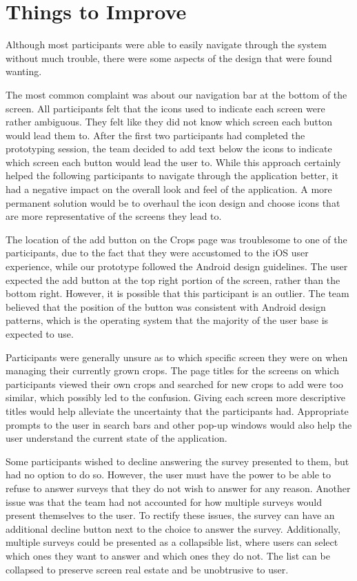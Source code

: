 \documentclass[12pt,letterpaper]{article}
\begin{document}
\section{Things to Improve}
Although most participants were able to easily navigate through the system without much trouble, there were some aspects of the design that were found wanting.\par
The most common complaint was about our navigation bar at the bottom of the screen. All participants felt that the icons used to indicate each screen were rather ambiguous. They felt like they did not know which screen each button would lead them to. After the first two participants had completed the prototyping session, the team decided to add text below the icons to indicate which screen each button would lead the user to. While this approach certainly helped the following participants to navigate through the application better, it had a negative impact on the overall look and feel of the application. A more permanent solution would be to overhaul the icon design and choose icons that are more representative of the screens they lead to.\par
The location of the add button on the Crops page was troublesome to one of the participants, due to the fact that they were accustomed to the iOS user experience, while our prototype followed the Android design guidelines. The user expected the add button at the top right portion of the screen, rather than the bottom right. However, it is possible that this participant is an outlier. The team believed that the position of the button was consistent with Android design patterns, which is the operating system that the majority of the user base is expected to use.\par
Participants were generally unsure as to which specific screen they were on when managing their currently grown crops. The page titles for the screens on which participants viewed their own crops and searched for new crops to add were too similar, which possibly led to the confusion. Giving each screen more descriptive titles would help alleviate the uncertainty that the participants had. Appropriate prompts to the user in search bars and other pop-up windows would also help the user understand the current state of the application.\par
Some participants wished to decline answering the survey presented to them, but had no option to do so. However, the user must have the power to be able to refuse to answer surveys that they do not wish to answer for any reason. Another issue was that the team had not accounted for how multiple surveys would present themselves to the user. To rectify these issues, the survey can have an additional decline button next to the choice to answer the survey. Additionally, multiple surveys could be presented as a collapsible list, where users can select which ones they want to answer and which ones they do not. The list can be collapsed to preserve screen real estate and be unobtrusive to user.\par
\end{document}

